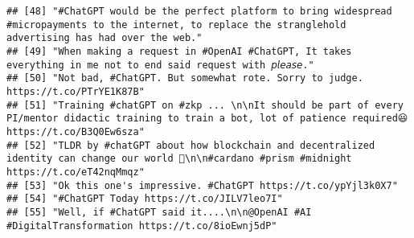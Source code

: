 \documentclass[
]{article}
\begin{document}
\begin{verbatim}
## [48] "#ChatGPT would be the perfect platform to bring widespread #micropayments to the internet, to replace the stranglehold advertising has had over the web."                                                                                                                                                                       
## [49] "When making a request in #OpenAI #ChatGPT, It takes everything in me not to end said request with 𝘱𝘭𝘦𝘢𝘴𝘦."                                                                                                                                                                                                                      
## [50] "Not bad, #ChatGPT. But somewhat rote. Sorry to judge. https://t.co/PTrYE1K87B"                                                                                                                                                                                                                                                  
## [51] "Training #chatGPT on #zkp ... \n\nIt should be part of every PI/mentor didactic training to train a bot, lot of patience required😆 https://t.co/B3Q0Ew6sza"                                                                                                                                                                    
## [52] "TLDR by #chatGPT about how blockchain and decentralized identity can change our world 🖖\n\n#cardano #prism #midnight https://t.co/eT42nqMmqz"                                                                                                                                                                                  
## [53] "Ok this one's impressive. #ChatGPT https://t.co/ypYjl3k0X7"                                                                                                                                                                                                                                                                     
## [54] "#ChatGPT Today https://t.co/JILV7leo7I"                                                                                                                                                                                                                                                                                         
## [55] "Well, if #ChatGPT said it....\n\n@OpenAI #AI #DigitalTransformation https://t.co/8ioEwnj5dP"                                                                                                                                                                                                                                    

\end{verbatim}
\end{document}
